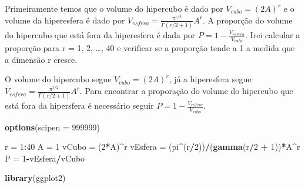 \documentclass[
]{article}
\newenvironment{Shaded}{\begin{snugshade}}{\end{snugshade}}
\newcommand{\AttributeTok}[1]{\textcolor[rgb]{0.13,0.29,0.53}{#1}}
\newcommand{\DecValTok}[1]{\textcolor[rgb]{0.00,0.00,0.81}{#1}}
\newcommand{\FunctionTok}[1]{\textcolor[rgb]{0.13,0.29,0.53}{\textbf{#1}}}
\newcommand{\NormalTok}[1]{#1}
\newcommand{\OtherTok}[1]{\textcolor[rgb]{0.56,0.35,0.01}{#1}}
\newcommand{\SpecialCharTok}[1]{\textcolor[rgb]{0.81,0.36,0.00}{\textbf{#1}}}
\begin{document}
Primeiramente temos que o volume do hipercubo é dado por
\(V_{cubo} = (2A)^r\) e o volume da hiperesfera é dado por
\(V_{esfera} = \frac{\pi^{r/2}}{\Gamma(r/2 + 1)}A^r\). A proporção do
volume do hipercubo que está fora da hiperesfera é dada por
\(P = 1 - \frac{V_{esfera}}{V_{cubo}}\). Irei calcular a proporção para
r = 1, 2, \ldots, 40 e verificar se a proporção tende a 1 a medida que a
dimensão r cresce.

O volume do hipercubo segue \(V_{cubo} = (2A)^r\), já a hiperesfera
segue \(V_{esfera} = \frac{\pi^{r/2}}{\Gamma(r/2 + 1)}A^r\). Para
encontrar a proporação do volume do hipercubo que está fora da
hipersfera é necessário seguir \(P = 1 - \frac{V_{esfera}}{V_{cubo}}\).

\begin{Shaded}
\begin{Highlighting}[]
\FunctionTok{options}\NormalTok{(}\AttributeTok{scipen =} \DecValTok{999999}\NormalTok{)}

\NormalTok{r }\OtherTok{=} \DecValTok{1}\SpecialCharTok{:}\DecValTok{40}
\NormalTok{A }\OtherTok{=} \DecValTok{1}
\NormalTok{vCubo }\OtherTok{=}\NormalTok{ (}\DecValTok{2}\SpecialCharTok{*}\NormalTok{A)}\SpecialCharTok{\^{}}\NormalTok{r}
\NormalTok{vEsfera }\OtherTok{=}\NormalTok{ (pi}\SpecialCharTok{\^{}}\NormalTok{(r}\SpecialCharTok{/}\DecValTok{2}\NormalTok{))}\SpecialCharTok{/}\NormalTok{(}\FunctionTok{gamma}\NormalTok{(r}\SpecialCharTok{/}\DecValTok{2} \SpecialCharTok{+} \DecValTok{1}\NormalTok{))}\SpecialCharTok{*}\NormalTok{A}\SpecialCharTok{\^{}}\NormalTok{r}
\NormalTok{P }\OtherTok{=} \DecValTok{1}\SpecialCharTok{{-}}\NormalTok{vEsfera}\SpecialCharTok{/}\NormalTok{vCubo}

\FunctionTok{library}\NormalTok{(ggplot2)}


\end{Highlighting}
\end{Shaded}
\end{document}
